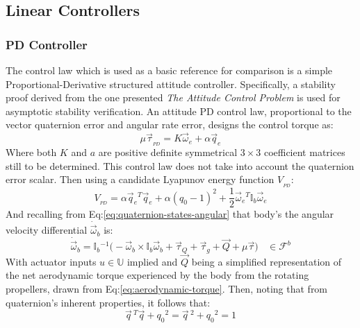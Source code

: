 \subsection{Linear Controllers}
\label{subsec:control.attitude.controllers}
\subsubsection{PD Controller}
\label{subsubsec:control.attitude.controllers.pd}
The control law which is used as a basic reference for comparison is a simple Proportional-Derivative structured attitude controller. Specifically, a stability proof derived from the one presented \emph{The Attitude Control Problem}\cite{attitudecontrolproblem} is used for asymptotic stability verification. An attitude PD control law, proportional to the vector quaternion error and angular rate error, designs the control torque as:
\begin{equation}\label{eq:independent-pd}
\mu\vec{\tau}_{_{PD}}=K\vec{\omega}_e+\alpha\vec{q}_e
\end{equation}
Where both $K$ and $a$ are positive definite symmetrical $3\times 3$ coefficient matrices still to be determined. This control law does not take into account the quaternion error scalar. Then using a candidate Lyapunov energy function $V_{_{PD}}$:
\begin{equation}\label{eq:lyapunov-pd}
V_{_{PD}}=\alpha\vec{q}_e\text{}^T\vec{q}_e+\alpha(q_0-1)^2+\frac{1}{2}\vec{\omega}_e\text{}^T\mathbb{I}_b\vec{\omega}_e
\end{equation}
And recalling from Eq:\ref{eq:quaternion-states-angular} that body's the angular velocity differential $\dot{\vec{\omega}}_b$ is:
\begin{equation}
\dot{\vec{\omega}}_b=\mathbb{I}_b\text{}^{-1}\big(-\vec{\omega}_b\times\mathbb{I}_b\vec{\omega}_b+\vec{\tau}_Q+\vec{\tau}_g+\vec{Q}+\mu\vec{\tau}\big)~~~~\in\mathcal{F}^b
\end{equation}
With actuator inputs $u\in\mathbb{U}$ implied and $\vec{Q}$ being a simplified representation of the net aerodynamic torque experienced by the body from the rotating propellers, drawn from Eq:\ref{eq:aerodynamic-torque}. Then, noting that from quaternion's inherent properties, it follows that:
\begin{equation}\label{eq:4.17}
\vec{q}\text{}^{\hspace{3pt}T}\vec{q}+q_0\text{}^2=\vec{q}\text{}^{\hspace{3pt}2}+q_0\text{}^2=1
\end{equation}
